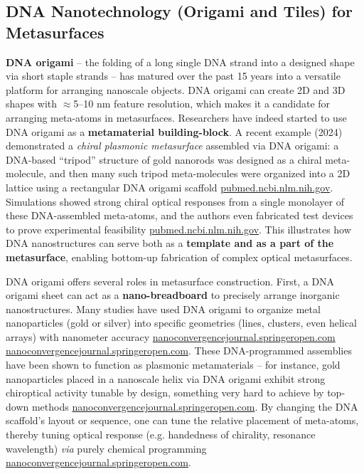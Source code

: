 \documentclass[11pt,a4paper]{article}
\begin{document}
\subsection{DNA Nanotechnology (Origami and Tiles) for Metasurfaces}

\textbf{DNA origami} -- the folding of a long single DNA strand into a designed shape via short staple strands -- has matured over the past 15 years into a versatile platform for arranging nanoscale objects. DNA origami can create 2D and 3D shapes with $\approx$5--10 nm feature resolution, which makes it a candidate for arranging meta-atoms in metasurfaces. Researchers have indeed started to use DNA origami as a \textbf{metamaterial building-block}. A recent example (2024) demonstrated a \emph{chiral plasmonic metasurface} assembled via DNA origami: a DNA-based ``tripod'' structure of gold nanorods was designed as a chiral meta-molecule, and then many such tripod meta-molecules were organized into a 2D lattice using a rectangular DNA origami scaffold \href{https://pubmed.ncbi.nlm.nih.gov/38859241/#:~:text=fabricated with top,of the suggested approach critically}{pubmed.ncbi.nlm.nih.gov}. Simulations showed strong chiral optical responses from a single monolayer of these DNA-assembled meta-atoms, and the authors even fabricated test devices to prove experimental feasibility \href{https://pubmed.ncbi.nlm.nih.gov/38859241/#:~:text=scalable bottom,of the suggested approach critically}{pubmed.ncbi.nlm.nih.gov}. This illustrates how DNA nanostructures can serve both as a \textbf{template and as a part of the metasurface}, enabling bottom-up fabrication of complex optical metasurfaces.

DNA origami offers several roles in metasurface construction. First, a DNA origami sheet can act as a \textbf{nano-breadboard} to precisely arrange inorganic nanostructures. Many studies have used DNA origami to organize metal nanoparticles (gold or silver) into specific geometries (lines, clusters, even helical arrays) with nanometer accuracy \href{https://nanoconvergencejournal.springeropen.com/articles/10.1186/s40580-020-00226-7#:~:text=metamaterials. A DNA,in handedness%2C color and intensity}{nanoconvergencejournal.springeropen.com} \href{https://nanoconvergencejournal.springeropen.com/articles/10.1186/s40580-020-00226-7#:~:text=fabricated by self,DNA sequences for achieving different}{nanoconvergencejournal.springeropen.com}. These DNA-programmed assemblies have been shown to function as plasmonic metamaterials -- for instance, gold nanoparticles placed in a nanoscale helix via DNA origami exhibit strong chiroptical activity tunable by design, something very hard to achieve by top-down methods \href{https://nanoconvergencejournal.springeropen.com/articles/10.1186/s40580-020-00226-7#:~:text=metamaterials. A DNA,in handedness%2C color and intensity}{nanoconvergencejournal.springeropen.com}. By changing the DNA scaffold's layout or sequence, one can tune the relative placement of meta-atoms, thereby tuning optical response (e.g. handedness of chirality, resonance wavelength) \emph{via} purely chemical programming \href{https://nanoconvergencejournal.springeropen.com/articles/10.1186/s40580-020-00226-7#:~:text=metamaterials. A DNA,in handedness%2C color and intensity}{nanoconvergencejournal.springeropen.com}.
\end{document}
